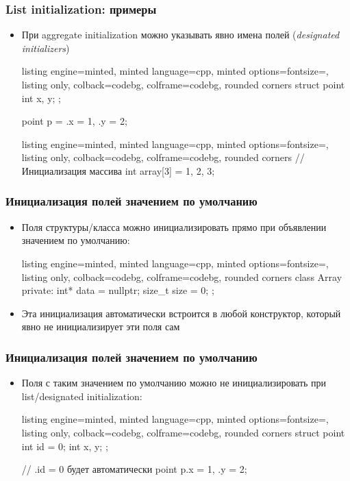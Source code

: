 \documentclass[10pt]{beamer}
\begin{document}
\begin{frame}[fragile]
\frametitle{List initialization: примеры}
\begin{itemize}
\item При aggregate initialization можно указывать явно имена полей (\textit{designated initializers})
\begin{tcblisting}{listing engine=minted, minted language=cpp, minted options={fontsize=\scriptsize}, listing only, colback=codebg, colframe=codebg, rounded corners}
struct point {
  int x, y;
};

point p = {.x = 1, .y = 2};
\end{tcblisting}
\pause
{}
\begin{tcblisting}{listing engine=minted, minted language=cpp, minted options={fontsize=\scriptsize}, listing only, colback=codebg, colframe=codebg, rounded corners}
// Инициализация массива
int array[3] = {1, 2, 3};
\end{tcblisting}
\end{itemize}
\end{frame}

\begin{frame}[fragile]
\frametitle{Инициализация полей значением по умолчанию}
\begin{itemize}
\item Поля структуры/класса можно инициализировать прямо при объявлении значением по умолчанию:
\begin{tcblisting}{listing engine=minted, minted language=cpp, minted options={fontsize=\scriptsize}, listing only, colback=codebg, colframe=codebg, rounded corners}
class Array {
private:
  int* data = nullptr;
  size_t size = 0;
};
\end{tcblisting}
\pause
\item Эта инициализация автоматически встроится в любой конструктор, который явно не инициализирует эти поля сам
\end{itemize}
\end{frame}

\begin{frame}[fragile]
\frametitle{Инициализация полей значением по умолчанию}
\begin{itemize}
\item Поля с таким значением по умолчанию можно не инициализировать при list/designated initialization:
\begin{tcblisting}{listing engine=minted, minted language=cpp, minted options={fontsize=\scriptsize}, listing only, colback=codebg, colframe=codebg, rounded corners}
struct point {
  int id = 0;
  int x, y;
};

// .id = 0 будет автоматически
point p{.x = 1, .y = 2};
\end{tcblisting}
\end{itemize}
\end{frame}
\end{document}
